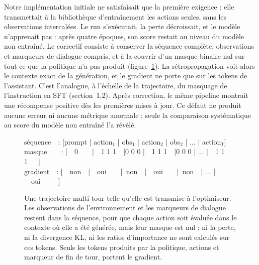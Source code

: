 \documentclass[11pt,a4paper]{article}
\begin{document}
Notre implémentation initiale ne satisfaisait que la première exigence : elle transmettait à la bibliothèque d'entraînement les actions seules, sans les observations intercalées. Le run s'exécutait, la perte décroissait, et le modèle n'apprenait pas : après quatre époques, son score restait au niveau du modèle non entraîné. Le correctif consiste à conserver la séquence complète, observations et marqueurs de dialogue compris, et à la couvrir d'un masque binaire nul sur tout ce que la politique n'a pas produit (figure~\ref{fig:env_mask}). La rétropropagation voit alors le contexte exact de la génération, et le gradient ne porte que sur les tokens de l'assistant. C'est l'analogue, à l'échelle de la trajectoire, du masquage de l'instruction en SFT (section~1.2). Après correction, le même pipeline montrait une récompense positive dès les premières mises à jour. Ce défaut ne produit aucune erreur ni aucune métrique anormale ; seule la comparaison systématique au score du modèle non entraîné l'a révélé.

\begin{figure}[htbp]
\centering
\begin{tcolorbox}[colback=gray!4, colframe=black!65, width=0.96\textwidth,
    title=\textbf{Séquence d'entraînement d'un épisode et masque des observations},
    fonttitle=\small, boxrule=0.6pt, arc=2mm, left=3mm, right=3mm, top=2mm, bottom=2mm]
{\small\ttfamily
séquence\ \ : [prompt | action$_1$ | obs$_1$ | action$_2$ | obs$_2$ | ... | action$_T$]\\
masque\ \ \ \ : [\ \ 0\ \ \ \ |\ \ 1 1 1\ \  |0 0 0 |\ \ 1 1 1\ \ |0 0 0 | ... |\ \ 1 1 1\ \ \ ]\\
gradient\  \ : [\ \ non\ \ |\ \ oui\ \ \ \  |\ non\ \ |\ \ oui\ \  \ \ |\ non\ \ | ... |\ \ oui\ \ \ \ \ ]
}
\end{tcolorbox}
\caption{Une trajectoire multi-tour telle qu'elle est transmise à l'optimiseur. Les observations de l'environnement et les marqueurs de dialogue restent dans la séquence, pour que chaque action soit évaluée dans le contexte où elle a été générée, mais leur masque est nul : ni la perte, ni la divergence KL, ni les ratios d'importance ne sont calculés sur ces tokens. Seuls les tokens produits par la politique, actions et marqueur de fin de tour, portent le gradient.}
\label{fig:env_mask}
\end{figure}
\end{document}
